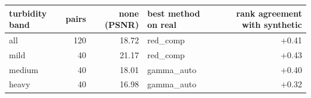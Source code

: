 \begin{tabular}{lrrlr}
\toprule
turbidity band & pairs & none (PSNR) & best method on real & rank agreement with synthetic \\
\midrule
all & 120 & 18.72 & red\_comp & +0.41 \\
mild & 40 & 21.17 & red\_comp & +0.43 \\
medium & 40 & 18.01 & gamma\_auto & +0.40 \\
heavy & 40 & 16.98 & gamma\_auto & +0.32 \\
\bottomrule
\end{tabular}
